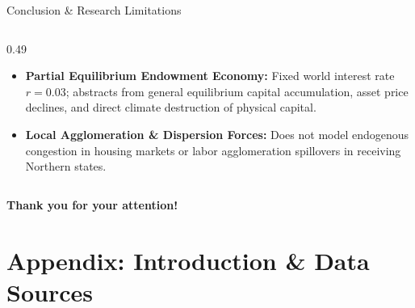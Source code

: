 \documentclass[aspectratio=169, 10pt]{beamer}
\begin{document}
\begin{frame}{Conclusion \& Research Limitations \hfill \hyperlink{backup:toc}{\scriptsize{}}}
\begin{columns}[onlytextwidth, T]
\begin{column}{0.49\textwidth}
\begin{tcolorbox}[leafbox, title=Structural Limitations \& Future Research]
\begin{itemize}
                    \item \textbf{Partial Equilibrium Endowment Economy:} Fixed world interest rate $r = 0.03$; abstracts from general equilibrium capital accumulation, asset price declines, and direct climate destruction of physical capital.
                    \item \textbf{Local Agglomeration \& Dispersion Forces:} Does not model endogenous congestion in housing markets or labor agglomeration spillovers in receiving Northern states.
                \end{itemize}
            \end{tcolorbox}
        \end{column}
    \end{columns}
\end{frame}
\begin{frame}
  \Large \centering \textbf{Thank you for your attention!}
\end{frame}
\appendix

\section{Appendix: Introduction \& Data Sources}
\end{document}
